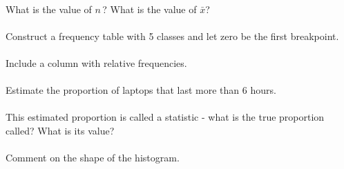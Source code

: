 \documentclass[12pt]{article}
\begin{document}
\hspace{-1.8cm}{\bf a.}\vspace{-0.5cm}\\
What is the value of $n$\,? What is the value of $\bar x$?\\[-0.3cm]

\hspace{-1.8cm}{\bf b.}\vspace{-0.5cm}\\
Construct a frequency table with 5 classes and let zero be the first breakpoint.\\[-0.3cm]

\hspace{-1.8cm}{\bf c.}\vspace{-0.5cm}\\
Include a column with relative frequencies.\\[-0.3cm]

\hspace{-1.8cm}{\bf d.}\vspace{-0.5cm}\\
Estimate the proportion of laptops that last more than 6 hours.\\[-0.3cm]

\hspace{-1.8cm}{\bf e.}\vspace{-0.5cm}\\
This estimated proportion is called a statistic - what is the true proportion called? What is its value?\\[-0.3cm]

\hspace{-1.8cm}{\bf f.}\vspace{-0.5cm}\\
Comment on the shape of the histogram.\\[-0.3cm]
\end{document}
